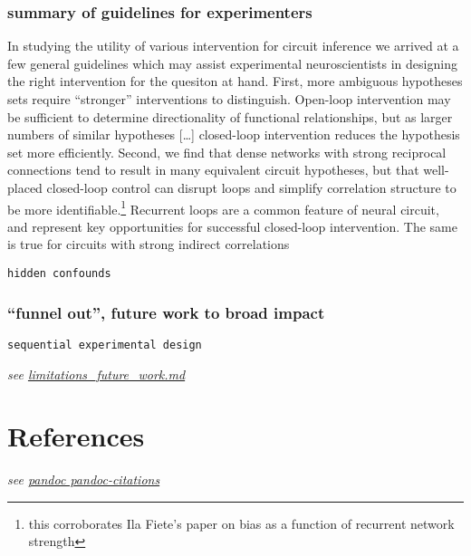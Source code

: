 \hypertarget{summary-of-guidelines-for-experimenters}{%
\subsubsection{summary of guidelines for
experimenters}\label{summary-of-guidelines-for-experimenters}}

In studying the utility of various intervention for circuit inference we
arrived at a few general guidelines which may assist experimental
neuroscientists in designing the right intervention for the quesiton at
hand. First, more ambiguous hypotheses sets require ``stronger''
interventions to distinguish. Open-loop intervention may be sufficient
to determine directionality of functional relationships, but as larger
numbers of similar hypotheses {[}\ldots{]} closed-loop intervention
reduces the hypothesis set more efficiently. Second, we find that dense
networks with strong reciprocal connections tend to result in many
equivalent circuit hypotheses, but that well-placed closed-loop control
can disrupt loops and simplify correlation structure to be more
identifiable.\footnote{this corroborates Ila Fiete's paper on bias as a
  function of recurrent network strength} Recurrent loops are a common
feature of neural circuit, and represent key opportunities for
successful closed-loop intervention. The same is true for circuits with
strong indirect correlations

\texttt{hidden\ confounds}

\hypertarget{funnel-out-future-work-to-broad-impact}{%
\subsubsection{``funnel out'', future work to broad
impact}\label{funnel-out-future-work-to-broad-impact}}

\texttt{sequential\ experimental\ design}

\emph{see
\href{/sketches_and_notation/discussion/limitations_future_work.md}{limitations\_future\_work.md}}

\hypertarget{references}{%
\section{References}\label{references}}

\emph{see
\href{https://github.com/shd101wyy/markdown-preview-enhanced/blob/master/docs/pandoc-bibliographies-and-citations.md}{pandoc
pandoc-citations}}
